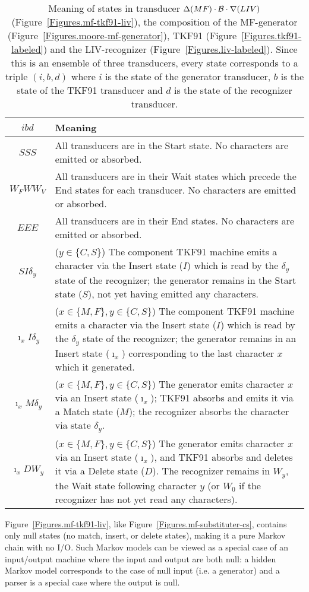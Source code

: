 \documentclass{article}
\newcommand{\tablabel}[1]{\label{tab.#1}}
\newcommand{\figref}[1]{Figure~\ref{Figures.#1}}
\newcommand\tkf{{\cal B}}
\newcommand\generate{\Delta}
\newcommand\recognize{\nabla}
\begin{document}
\begin{table}
\begin{tabular}{c|p{}}
$i b d$ & Meaning \\
\hline
$SSS$ & All transducers are in the Start state.  No characters are emitted or absorbed. 
\\
$W_FWW_V$ & All transducers are in their Wait states which precede the End states for each transducer.  No characters are emitted or absorbed. 
\\
$EEE$ & All transducers are in their End states.  No characters are emitted or absorbed. 
\\
$SI\delta_y$ &
($y \in \{C,S\}$)
 The component TKF91 machine emits a character via the Insert state ($I$) which is read by the $\delta_y$ state of the recognizer; the generator remains in the Start state ($S$), not yet having emitted any characters. 
\\
$\imath_x I\delta_y$ &
($x \in \{M,F\}, y \in \{C,S\}$)
 The component  TKF91 machine emits a character via the Insert state ($I$) which is read by the $\delta_y$ state of the recognizer; the generator remains in an Insert state ($\imath_x$) corresponding to the last character $x$ which it generated. 
\\
$\imath_x M\delta_y$ & 
($x \in \{M,F\}, y \in \{C,S\}$)
The generator emits character $x$ via an Insert state ($\imath_x$); TKF91 absorbs and emits it via a Match state ($M$);  
the recognizer absorbs the character via state $\delta_y$.  
\\
$\imath_x D W_y$ & 
($x \in \{M,F\}, y \in \{C,S\}$)
The generator emits character $x$ via an Insert state ($\imath_x$), and TKF91 absorbs and deletes it via a Delete state ($D$).  
The recognizer  remains in $W_y$, the Wait  state following character $y$ (or $W_0$ if the recognizer  has not yet read any characters). 
\end{tabular}
\caption{ \tablabel{mf-tkf91-liv} Meaning of states in
transducer $\generate(MF) \cdot \tkf \cdot \recognize(LIV)$ (\figref{mf-tkf91-liv}),
the composition of the MF-generator (\figref{moore-mf-generator}),
TKF91 (\figref{tkf91-labeled}) and
the LIV-recognizer (\figref{liv-labeled}).
Since this is an ensemble of three transducers, every state corresponds to a triple $(i,b,d)$
where
$i$ is the state of the generator transducer,
$b$ is the state of the TKF91 transducer and
$d$ is the state of the recognizer transducer.
 }
\end{table}


\figref{mf-tkf91-liv}, like \figref{mf-substituter-cs}, contains only null states (no match, insert, or delete states), making it a pure Markov chain with no I/O.  
Such Markov models can be viewed as a special case of an input/output machine where the input and output are both null:
a hidden Markov model corresponds to  the case of null input (i.e. a generator)
and a parser is a special case where the output is null.  
\end{document}
